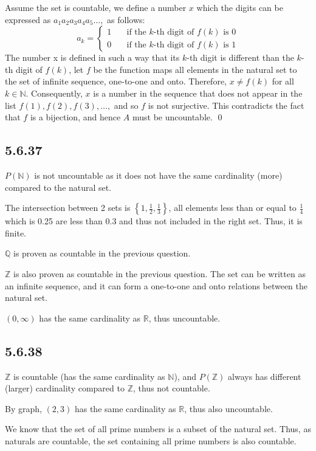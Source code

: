 \documentclass{article}
\begin{document}
Assume  the set is countable, we define a number $x$ which the digits can be expressed as $a_1a_2a_3a_4a_5\ldots,$ as follows: $$a_k=\begin{cases}
    1 \quad&\text{if the $k$-th digit of $f(k)$ is 0}\\
    0 \quad&\text{if the $k$-th digit of $f(k)$ is 1}
\end{cases}$$
The number x is defined in such a way that its $k$-th digit is different than the $k$-th digit of $f(k)$, let $f$ be the function maps all elements in the natural set to the set of infinite sequence, one-to-one and onto. Therefore, $x\neq f(k)$ for all $k\in\mathbb{N}$. Consequently, $x$ is a number in the sequence that does not appear in the list $f(1),f(2),f(3),\ldots,$ and so $f$ is not surjective. This contradicts the fact that $f$ is a bijection, and hence $A$ must be uncountable. \qed

\subsection*{5.6.37}

$P(\mathbb{N})$ is not uncountable as it does not have the same cardinality (more) compared to the natural set.

The intersection between 2 sets is $\left\{1,\frac{1}{2}, \frac13\right\}$, all elements less than or equal to $\frac{1}{4}$ which is 0.25 are less than 0.3 and thus not included in the right set. Thus, it is finite.

$\mathbb{Q}$ is proven as countable in the previous question.

$\mathbb{Z}$ is also proven as countable in the previous question. The set can be written as an infinite sequence, and it can form a one-to-one and onto relations between the natural set.

$(0,\infty)$ has the same cardinality as $\mathbb{R}$, thus uncountable.

\subsection*{5.6.38}

$\mathbb{Z}$ is countable (has the same cardinality as $\mathbb{N}$), and $P(\mathbb{Z})$ always has different (larger) cardinality compared to $\mathbb{Z}$, thus not countable.

By graph, $(2,3)$ has the same cardinality as $\mathbb{R}$, thus also uncountable.

We know that the set of all prime numbers is a subset of the natural set. Thus, as naturals are countable, the set containing all prime numbers is also countable.
\end{document}
